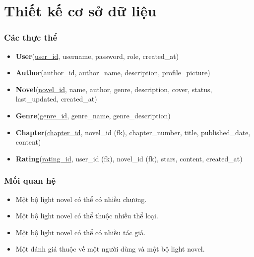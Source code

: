 \documentclass[12pt,aspectratio=169,handout]{beamer}
\begin{document}

\section{Thiết kế cơ sở dữ liệu}

\begin{frame}
    \frametitle{Các thực thể}
    \begin{itemize}
        \item \textbf{User}(\underline{user\_id}, username, password, role, created\_at)
        \item \textbf{Author}(\underline{author\_id}, author\_name, description, profile\_picture)
        \item \textbf{Novel}(\underline{novel\_id}, name, author, genre, description, cover, status, last\_updated, created\_at)
        \item \textbf{Genre}(\underline{genre\_id}, genre\_name, genre\_description)
        \item \textbf{Chapter}(\underline{chapter\_id}, novel\_id (fk), chapter\_number, title, published\_date, content)
        \item \textbf{Rating}(\underline{rating\_id}, user\_id (fk), novel\_id (fk), stars, content, created\_at)
    \end{itemize}
\end{frame}

\begin{frame}
    \frametitle{Mối quan hệ}
    \begin{itemize}
        \item Một bộ light novel có thể có nhiều chương.
        \item Một bộ light novel có thể thuộc nhiều thể loại.
        \item Một bộ light novel có thể có nhiều tác giả.
        \item Một đánh giá thuộc về một người dùng và một bộ light novel.
    \end{itemize}
\end{frame}
\end{document}
